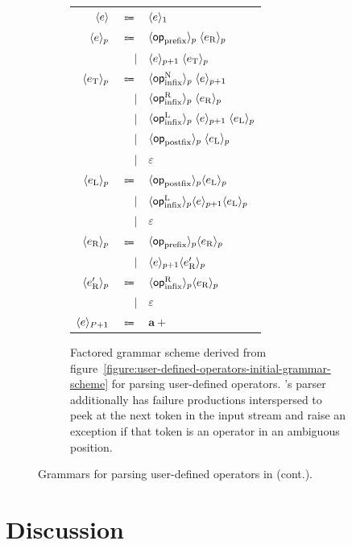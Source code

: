 \begin{figure}\ContinuedFloat
\begin{subfigure}{\linewidth}
\centering
\begin{tabular}{rrl}
$ \langle e\rangle $ & $ \Coloneqq $ & $ \langle e\rangle_1 $\\
$ \langle e\rangle_p $ & $ \Coloneqq $ & $ \langle\mathsf{op}_{\text{prefix}}\rangle_p \; \langle e_\text{R}\rangle_p $\\
& $ \mid $ & $ \langle e\rangle_{p + 1} \; \langle e_\text{T}\rangle_p $\\
$ \langle e_\text{T}\rangle_p $ & $ \Coloneqq $ & $ \langle\mathsf{op}_{\text{infix}}^\text{N}\rangle_p \; \langle e\rangle_{p + 1} $\\
& $ \mid $ & $ \langle\mathsf{op}_{\text{infix}}^\text{R}\rangle_p \; \langle e_\text{R}\rangle_p $\\
& $ \mid $ & $ \langle\mathsf{op}_{\text{infix}}^\text{L}\rangle_p \; \langle e\rangle_{p + 1} \; \langle e_\text{L}\rangle_p $\\
& $ \mid $ & $ \langle\mathsf{op}_{\text{postfix}}\rangle_p \; \langle e_\text{L}\rangle_p $\\
& $ \mid $ & $ \varepsilon $\\
$ \langle e_\text{L}\rangle_p $ & $ \Coloneqq $ & $ \langle\mathsf{op}_{\text{postfix}}\rangle_p \langle e_\text{L}\rangle_p $\\
& $ \mid $ & $ \langle\mathsf{op}_{\text{infix}}^\text{L}\rangle_p \langle e\rangle_{p + 1} \langle e_\text{L}\rangle_p $\\
& $ \mid $ & $ \varepsilon $\\
$ \langle e_\text{R}\rangle_p $ & $ \Coloneqq $ & $ \langle\mathsf{op}_{\text{prefix}}\rangle_p \langle e_\text{R}\rangle_p $\\
& $ \mid $ & $ \langle e\rangle_{p + 1} \langle e_\text{R}'\rangle_p $\\
$ \langle e_\text{R}'\rangle_p $ & $ \Coloneqq $ & $ \langle\mathsf{op}_{\text{infix}}^\text{R}\rangle_p \langle e_\text{R}\rangle_p $\\
& $ \mid $ & $ \varepsilon $\\
$ \langle e\rangle_{P + 1} $ & $ \Coloneqq $ & $ \mathbf{a}+ $
\end{tabular}
\caption{Factored grammar scheme derived from figure~\ref{figure:user-defined-operators-initial-grammar-scheme} for parsing user-defined operators.
\Beluga's parser additionally has failure productions interspersed to peek at the next token in the input stream and raise an exception if that token is an operator in an ambiguous position.}
\label{figure:user-defined-operators-final-grammar-scheme}
\end{subfigure}
\caption[]{Grammars for parsing user-defined operators in \Beluga (cont.).}
\end{figure}

\section{Discussion}\label{section:parser-discussion}

